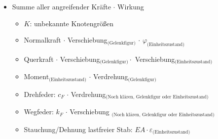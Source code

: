 \documentclass[fleqn,twoside]{article}
\begin{document}
\begin{enumerate}
\begin{enumerate}
                        \begin{itemize}
                            \item Summe aller angreifender Kräfte $\cdot$ Wirkung 
                                \begin{itemize}
                                    \item $K$: unbekannte Knotengrößen
                                    \item Normalkraft $\cdot$ Verschiebung$_{\text{(Gelenkfigur)}}$ $\cdot$  $\varphi_{\text{(Einheitszustand)}}$
                                    \item Querkraft $\cdot$ Verschiebung$_{\text{(Gelenkfigur)}} \cdot$ Verschiebung$_{\text{(Einheitszustand)}}$
                                    \item Moment$_{\text{(Einheitszustand)}}$ $\cdot$ Verdrehung$_{\text{(Gelenkfigur)}}$
                                    \item Drehfeder: $c_F$ $\cdot$ Verdrehung$_{\text{(Noch klären, Gelenkfigur oder Einheitszustand)}}$
                                    \item Wegfeder: $k_F$ $\cdot$ Verschiebung $_{\text{(Noch klären, Gelenkfigur oder Einheitszustand)}}$
                                    \item Stauchung/Dehnung lastfreier Stab: $EA \cdot \varepsilon_{\text{(Einheitszustand)}}$
                                \end{itemize}


\end{itemize}
\end{enumerate}
\end{enumerate}
\end{document}
